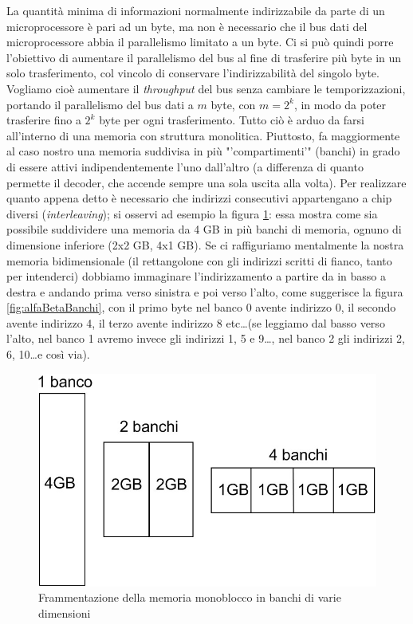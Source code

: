 La quantità minima di informazioni normalmente indirizzabile da parte di un microprocessore è pari ad un byte, ma non è necessario che il bus dati del microprocessore abbia il parallelismo limitato a un byte. Ci si può quindi porre l'obiettivo di aumentare il parallelismo del bus al fine di trasferire più byte in un solo trasferimento, col vincolo di conservare l'indirizzabilità del singolo byte. Vogliamo cioè aumentare il \textit{throughput} del bus senza cambiare le temporizzazioni, portando il parallelismo del bus dati a $m$ byte, con $ m = 2^k$, in modo da poter trasferire fino a $2^k$ byte per ogni trasferimento. Tutto ciò è arduo da farsi all'interno di una memoria con struttura monolitica. Piuttosto, fa maggiormente al caso nostro una memoria suddivisa in più "'compartimenti'" (banchi) in grado di essere attivi indipendentemente l'uno dall'altro (a differenza di quanto permette il decoder, che accende sempre una sola uscita alla volta). Per realizzare quanto appena detto è necessario che indirizzi consecutivi appartengano a chip diversi (\textit{interleaving}); si osservi ad esempio la figura \ref{fig:bancobanchi}: essa mostra come sia possibile suddividere una memoria da 4 GB in più banchi di memoria, ognuno di dimensione inferiore (2x2 GB, 4x1 GB). Se ci raffiguriamo mentalmente la nostra memoria bidimensionale (il rettangolone con gli indirizzi scritti di fianco, tanto per intenderci) dobbiamo immaginare l'indirizzamento a partire da in basso a destra e andando prima verso sinistra e poi verso l'alto, come suggerisce la figura \ref{fig:alfaBetaBanchi}, con il primo byte nel banco 0 avente indirizzo 0, il secondo avente indirizzo 4, il terzo avente indirizzo 8 etc\ldots (se leggiamo dal basso verso l'alto, nel banco 1 avremo invece gli indirizzi 1, 5 e 9\ldots, nel banco 2 gli indirizzi 2, 6, 10\ldots e così via).

\begin{figure}[!h]
\centering
\includegraphics[width=0.5\columnwidth]{img/bancobanchi}
\caption{Frammentazione della memoria monoblocco in banchi di varie dimensioni}
\label{fig:bancobanchi}
\end{figure}

